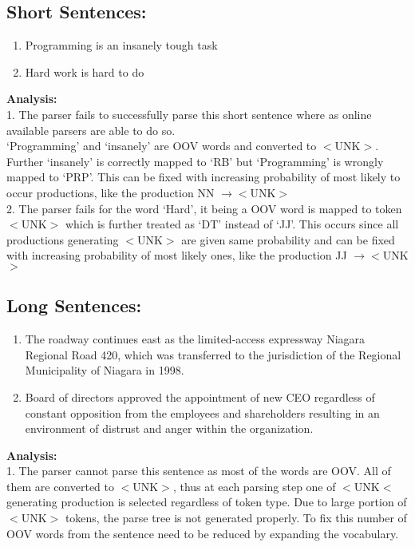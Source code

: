 \documentclass[11pt,a4paper]{article}
\begin{document}
\subsection{Short Sentences:}
\begin{enumerate}
    \item Programming is an insanely tough task
    \item Hard work is hard to do
\end{enumerate}

\textbf{Analysis:} \\
1. The parser fails to successfully parse this short sentence where as online available parsers are able to do so. \\
`Programming' and `insanely' are OOV words and converted to $<$UNK$>$. Further `insanely' is correctly mapped to `RB' but `Programming' is wrongly mapped to `PRP'. This can be fixed with increasing probability of most likely to occur productions, like the production NN $\rightarrow <$UNK$>$ \\

2. The parser fails for the word `Hard', it being a OOV word is mapped to token $<$UNK$>$ which is further treated as `DT' instead of `JJ'.
This occurs since all productions generating $<$UNK$>$ are given same probability and can be fixed with increasing probability of most likely ones, like the production JJ $\rightarrow <$UNK$>$

\subsection{Long Sentences:}
\begin{enumerate}
    \item The roadway continues east as the limited-access expressway Niagara Regional Road 420, which was transferred to the jurisdiction of the Regional Municipality of Niagara in 1998.
    \item Board of directors approved the appointment of new CEO regardless of constant opposition from the employees and shareholders resulting in an environment of distrust and anger within the organization.

\end{enumerate}
\textbf{Analysis:} \\
1. The parser cannot parse this sentence as most of the words are OOV. All of them are converted to $<$UNK$>$, thus at each parsing step one of $<$UNK$<$ generating production is selected regardless of token type. Due to large portion of $<$UNK$>$ tokens, the parse tree is not generated properly. To fix this number of OOV words from the sentence need to be reduced by expanding the vocabulary. 
\end{document}
